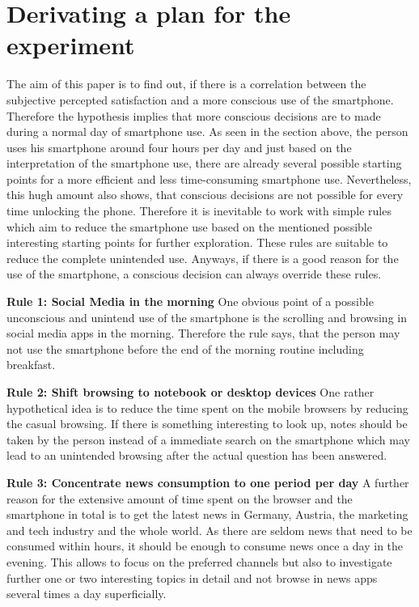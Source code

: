 \documentclass[11pt,letterpaper]{article}
\begin{document}
\section*{Derivating a plan for the experiment}
The aim of this paper is to find out, if there is a correlation between the subjective percepted satisfaction and a more conscious use of the smartphone. Therefore the hypothesis implies that more conscious decisions are to made during a normal day of smartphone use. As seen in the section above, the person uses his smartphone around four hours per day and just based on the interpretation of the smartphone use, there are already several possible starting points for a more efficient and less time-consuming smartphone use. Nevertheless, this hugh amount also shows, that conscious decisions are not possible for every time unlocking the phone. Therefore it is inevitable to work with simple rules which aim to reduce the smartphone use based on the mentioned possible interesting starting points for further exploration. These rules are suitable to reduce the complete unintended use. Anyways, if there is a good reason for the use of the smartphone, a conscious decision can always override these rules.

\textbf{Rule 1: Social Media in the morning}
One obvious point of a possible unconscious and unintend use of the smartphone is the scrolling and browsing in social media apps in the morning. Therefore the rule says, that the person may not use the smartphone before the end of the morning routine including breakfast. \newline

\textbf{Rule 2: Shift browsing to notebook or desktop devices}
One rather hypothetical idea is to reduce the time spent on the mobile browsers by reducing the casual browsing. If there is something interesting to look up, notes should be taken by the person instead of a immediate search on the smartphone which may lead to an unintended browsing after the actual question has been answered. \newline

\textbf{Rule 3: Concentrate news consumption to one period per day}
A further reason for the extensive amount of time spent on the browser and the smartphone in total is to get the latest news in Germany, Austria, the marketing and tech industry and the whole world. As there are seldom news that need to be consumed within hours, it should be enough to consume news once a day in the evening. This allows to focus on the preferred channels but also to investigate further one or two interesting topics in detail and not browse in news apps several times a day superficially. \newline
\end{document}
